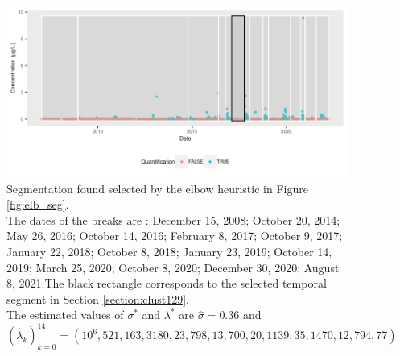 \begin{figure}[htbp]
  \centering
  \includegraphics[]{figs/Chap5/Seg_opt-1.pdf}
  \caption{Segmentation found selected by the elbow heuristic in Figure \ref{fig:elb_seg}. \\
  The dates of the breaks are : December 15, 2008; October 20, 2014; May 26, 2016; October 14, 2016; February 8, 2017; October 9, 2017; January 22, 2018; October 8, 2018; January 23, 2019; October 14, 2019; March 25, 2020; October 8, 2020; December 30, 2020; August 8, 2021.The black rectangle corresponds to the selected temporal segment in Section \ref{section:clust129}. \\
The estimated values of $\sigma^*$ and $\lambda^*$ are $\widehat{\sigma} = 0.36$ and\\ 
$(\widehat{\lambda}_k)_{k=0}^{14} =(10^6,521,163,3180,23,798,13,700,20,1139,35,1470,12,794,77)$}\label{fig:seg}
\end{figure}





